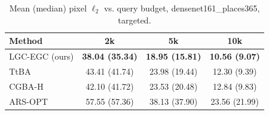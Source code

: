 \begin{table}[t]
\centering\footnotesize
\caption{Mean (median) pixel $\ell_2$ vs. query budget, densenet161\_places365, targeted.}
\begin{tabular}{lccc}
\toprule
Method & 2k & 5k & 10k \\
\midrule
LGC-EGC (ours) & \textbf{38.04 (35.34)} & \textbf{18.95 (15.81)} & \textbf{10.56 (9.07)} \\
TtBA & 43.41 (41.74) & 23.98 (19.44) & 12.30 (9.39) \\
CGBA-H & 42.10 (41.72) & 23.53 (20.48) & 12.84 (9.83) \\
ARS-OPT & 57.55 (57.36) & 38.13 (37.90) & 23.56 (21.99) \\
\bottomrule
\end{tabular}
\end{table}
